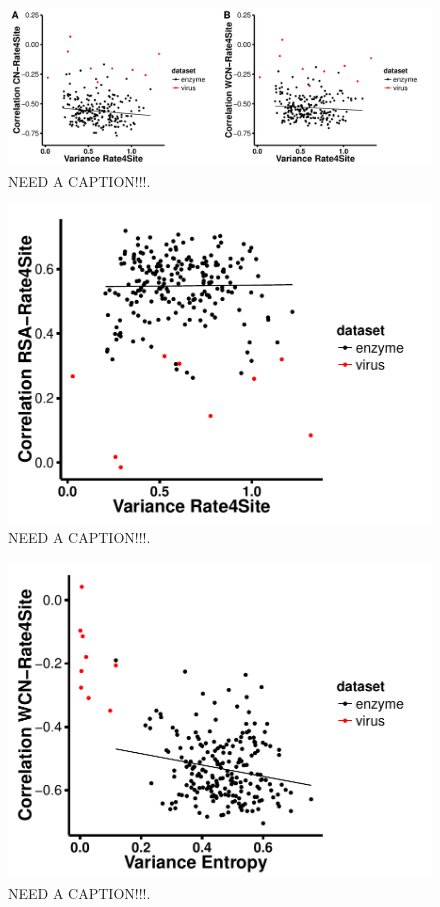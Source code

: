 \documentclass[12pt]{article}
\begin{document}
       
        \begin{figure}[H]
            \centerline{\includegraphics[width=7.5in]{rate_cor.pdf}}     
            \caption{NEED A CAPTION!!!.}
            \label{fig:seqent_structure_cors}
    \end{figure}
    
    
            \begin{figure}[H]
            \centerline{\includegraphics[width=5.0in]{var_rate_rsa_cor.pdf}}     
            \caption{NEED A CAPTION!!!.}
            \label{fig:seqent_structure_cors}
    \end{figure}
    
        \begin{figure}[H]
            \centerline{\includegraphics[width=5.0in]{var_entropy_rate_cor.pdf}}     
            \caption{NEED A CAPTION!!!.}
            \label{fig:seqent_structure_cors}
    \end{figure}
    
\end{document}
